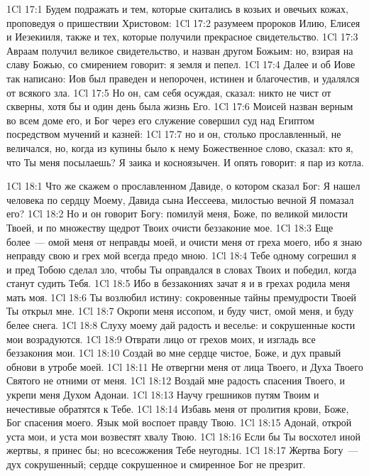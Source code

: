 \vs 1Cl 17:1
Будем подражать и тем,
которые скитались в козьих и овечьих кожах, проповедуя о пришествии Христовом:
\vs 1Cl 17:2
разумеем пророков Илию,
Елисея и Иезекииля, также и тех, которые получили прекрасное свидетельство.
\vs 1Cl 17:3
Авраам получил великое
свидетельство, и назван другом Божьим: но, взирая на славу Божью, со смирением
говорит: я земля и пепел.
\vs 1Cl 17:4
Далее и об Иове так
написано: Иов был праведен и непорочен, истинен и благочестив, и удалялся от
всякого зла.
\vs 1Cl 17:5
Но он, сам себя осуждая,
сказал: никто не чист от скверны, хотя бы и один день была жизнь Его.
\vs 1Cl 17:6
Моисей назван верным во
всем доме его, и Бог через его служение совершил суд над Египтом посредством
мучений и казней:
\vs 1Cl 17:7
но и он, столько
прославленный, не величался, но, когда из купины было к нему Божественное
слово, сказал: кто я, что Ты меня посылаешь? Я заика и косноязычен. И опять
говорит: я пар из котла.

\vs 1Cl 18:1
Что же скажем о
прославленном Давиде, о котором сказал Бог: Я нашел человека по сердцу Моему,
Давида сына Иессеева, милостью вечной Я помазал его?
\vs 1Cl 18:2
Но и он говорит Богу:
помилуй меня, Боже, по великой милости Твоей, и по множеству щедрот Твоих
очисти беззаконие мое.
\vs 1Cl 18:3
Еще более~--- омой меня от
неправды моей, и очисти меня от греха моего, ибо я знаю неправду свою и грех
мой всегда предо мною.
\vs 1Cl 18:4
Тебе одному согрешил я и
пред Тобою сделал зло, чтобы Ты оправдался в словах Твоих и победил, когда
станут судить Тебя.
\vs 1Cl 18:5
Ибо в беззакониях зачат я
и в грехах родила меня мать моя.
\vs 1Cl 18:6
Ты возлюбил истину:
сокровенные тайны премудрости Твоей Ты открыл мне.
\vs 1Cl 18:7
Окропи меня иссопом, и
буду чист, омой меня, и буду белее снега.
\vs 1Cl 18:8
Слуху моему дай радость и
веселье: и сокрушенные кости мои возрадуются.
\vs 1Cl 18:9
Отврати лицо от грехов
моих, и изгладь все беззакония мои.
\vs 1Cl 18:10
Создай во мне сердце
чистое, Боже, и дух правый обнови в утробе моей.
\vs 1Cl 18:11
Не отвергни меня от лица
Твоего, и Духа Твоего Святого не отними от меня.
\vs 1Cl 18:12
Воздай мне радость
спасения Твоего, и укрепи меня Духом Адонаи.
\vs 1Cl 18:13
Научу грешников путям
Твоим и нечестивые обратятся к Тебе.
\vs 1Cl 18:14
Избавь меня от пролития
крови, Боже, Бог спасения моего. Язык мой воспоет правду Твою.
\vs 1Cl 18:15
Адонай, открой уста мои,
и уста мои возвестят хвалу Твою.
\vs 1Cl 18:16
Если бы Ты восхотел иной
жертвы, я принес бы; но всесожжения Тебе неугодны.
\vs 1Cl 18:17
Жертва Богу~--- дух
сокрушенный; сердце сокрушенное и смиренное Бог не презрит.

